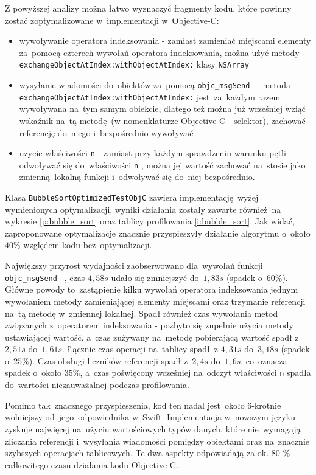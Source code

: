 \documentclass[mgr, shortabstract]{iithesis}
\newcommand{\objcinline}[1]{
    \texttt{#1}
}
\begin{document}
Z powyższej analizy można łatwo wyznaczyć fragmenty kodu, które powinny zostać zoptymalizowane w~implementacji w~Objective-C:

\begin{itemize}
    \item wywoływanie operatora indeksowania - zamiast zamieniać miejscami elementy za~pomocą czterech wywołań operatora indeksowania, można użyć metody \objcinline{exchangeObjectAtIndex:withObjectAtIndex:} klasy \objcinline{NSArray}
    \item wysyłanie wiadomości do~obiektów za~pomocą \objcinline{objc_msgSend } - metoda \objcinline{exchangeObjectAtIndex:withObjectAtIndex:} jest~za~każdym razem wywoływana na~tym samym obiekcie, dlatego też można już wcześniej wziąć wskaźnik na~tą metodę (w nomenklaturze Objective-C - selektor), zachować referencję do~niego i~bezpośrednio wywoływać
    \item użycie właściwości \objcinline{n} - zamiast przy każdym sprawdzeniu warunku pętli odwoływać się do~właściwości \objcinline{n}, można jej wartość zachować na~stosie jako zmienną lokalną funkcji i~odwoływać się do~niej bezpośrednio.
\end{itemize}

Klasa \objcinline{BubbleSortOptimizedTestObjC} zawiera implementację wyżej wymienionych optymalizacji, wyniki działania zostały zawarte również na wykresie \ref{p:bubble_sort} oraz tablicy profilowania \ref{i:bubble_sort}. Jak widać, zaproponowane optymalizacje znacznie przyspieszyły działanie algorytmu o~około $40\%$ względem kodu bez~optymalizacji.

Największy przyrost wydajności zaobserwowano dla~wywołań funkcji \objcinline{objc_msgSend }, czas $4,58s$ udało się zmniejszyć do~$1,83s$ (spadek o~$60\%$). Główne powody to~zastąpienie kilku wywołań operatora indeksowania jednym wywołaniem metody zamieniającej elementy miejscami oraz trzymanie referencji na~tą metodę w~zmiennej lokalnej. Spadł również czas wywołania metod związanych z~operatorem indeksowania - pozbyto się zupełnie użycia metody ustawiającej wartość, a~czas zużywany na~metodę pobierającą wartość spadł z~$2,51s$ do~$1,61s$. Łącznie czas operacji na~tablicy spadł z $4,31s$ do~$3,18s$ (spadek o~$25\%$). Czas obsługi liczników referencji spadł z~$2,4s$ do~$1,6s$, co~oznacza spadek o~około $35\%$, a~czas poświęcony wcześniej na~odczyt właściwości \objcinline{n} spadła do~wartości niezauważalnej podczas profilowania.

Pomimo tak~znacznego przyspieszenia, kod ten nadal jest~około 6-krotnie wolniejszy od~jego~odpowiednika w~Swift. Implementacja w~nowszym języku zyskuje najwięcej na~użyciu wartościowych typów danych, które nie~wymagają zliczania referencji i~wysyłania wiadomości pomiędzy obiektami oraz na~znacznie szybszych operacjach tablicowych. Te dwa aspekty odpowiadają za ok. 80 \% całkowitego czasu działania kodu Objective-C.
\end{document}
